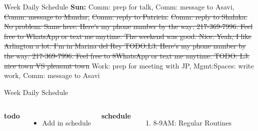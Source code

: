 \documentclass[serif, mathserif, final]{beamer}
\newcommand{\doneTaskNoItemNewLine}[1]{\sout{#1}}
\begin{document}
\begin{frame}
\begin{columns}
\begin{column}{0.5\linewidth}
  \begin{block}{Week Daily Schedule} %
    {\bf Sun:}  Comm: prep for talk, Comm: message to Asavi,
     \doneTaskNoItemNewLine{Comm: message to
      Mandar,} 
    \doneTaskNoItemNewLine{Comm: reply to Patricia.}
    \doneTaskNoItemNewLine{Comm: reply to Shalaka. No problem. Same here. Here's my
      phone number by the way: 217-369-7996. Feel free to WhatsApp or
      text me anytime. The weekend was good. Nice. Yeah, I like Arlington a lot. 
      I'm in Marina del Rey 
      TODO:L3: Here's my phone number by the way: 217-369-7996. Feel
      free to 8WhatsApp or text me anytime.
      TODO: L3: nice town  VS pleasant town 
    }
     Work: prep for meeting with JP, Mgmt:Spaces:
    write work, Comm: message to Asavi
  \end{block} 

  \begin{block}{Week Daily Schedule}

    \begin{columns}
         {\small \bf todo}\\ 
        \begin{itemize}
          \tiny \item \tiny Add in schedule
        \end{itemize} 
        \textbf{\small schedule}\\
        \begin{enumerate} 
          \tiny \item \tiny 8-9AM: Regular Routines 
        \end{enumerate}


\end{columns}
\end{block}
\end{column}
\end{columns}
\end{frame}
\end{document}
